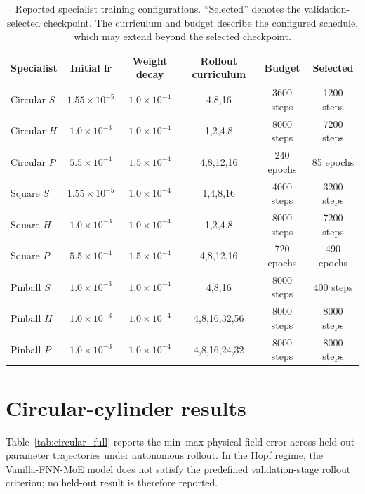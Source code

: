 \documentclass{article}
\begin{document}
\par
\begin{table}[H]
\centering
\caption{
Reported specialist training configurations. ``Selected'' denotes the validation-selected checkpoint. The curriculum and budget describe the configured schedule, which may extend beyond the selected checkpoint.
}
\label{tab:specialist_training}
\small
\setlength{\tabcolsep}{3.5pt}
\begin{tabular}{@{}lccccc@{}}
\toprule
Specialist & Initial lr & Weight decay & Rollout curriculum & Budget & Selected \\
\midrule
Circular $S$
& $1.55{\times}10^{-5}$ & $1.0{\times}10^{-4}$
& 4,8,16 & 3600 steps & 1200 steps \\
Circular $H$
& $1.0{\times}10^{-3}$ & $1.0{\times}10^{-4}$
& 1,2,4,8 & 8000 steps & 7200 steps \\
Circular $P$
& $5.5{\times}10^{-4}$ & $1.5{\times}10^{-4}$
& 4,8,12,16 & 240 epochs & 85 epochs \\
\addlinespace
Square $S$
& $1.55{\times}10^{-5}$ & $1.0{\times}10^{-4}$
& 1,4,8,16 & 4000 steps & 3200 steps \\
Square $H$
& $1.0{\times}10^{-3}$ & $1.0{\times}10^{-4}$
& 1,2,4,8 & 8000 steps & 7200 steps \\
Square $P$
& $5.5{\times}10^{-4}$ & $1.5{\times}10^{-4}$
& 4,8,12,16 & 720 epochs & 490 epochs \\
\addlinespace
Pinball $S$
& $1.0{\times}10^{-3}$ & $1.0{\times}10^{-4}$
& 4,8,16 & 8000 steps & 400 steps \\
Pinball $H$
& $1.0{\times}10^{-3}$ & $1.0{\times}10^{-4}$
& 4,8,16,32,56 & 8000 steps & 8000 steps \\
Pinball $P$
& $1.0{\times}10^{-3}$ & $1.0{\times}10^{-4}$
& 4,8,16,24,32 & 8000 steps & 8000 steps \\
\bottomrule
\end{tabular}
\end{table}
\par

\section{Circular-cylinder results}
\label{app:circular}

Table~\ref{tab:circular_full} reports the min--max physical-field error across held-out parameter trajectories under autonomous rollout. In the Hopf regime, the Vanilla-FNN-MoE model does not satisfy the predefined validation-stage rollout criterion; no held-out result is therefore reported.
\end{document}
